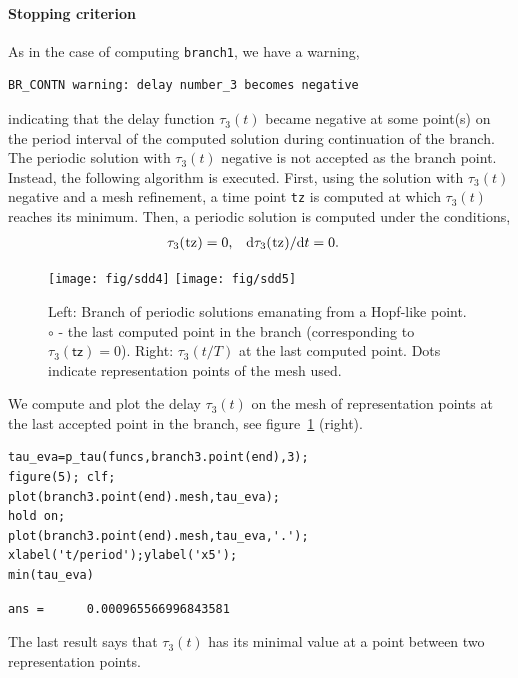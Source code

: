 \documentclass[10pt]{scrartcl}
\newcommand{\parm}[1]{\mathsf{#1}}
\renewcommand{\d}{\mathrm{d}}
\newcommand{\blist}[1]{\mbox{\lstinline!#1!}}
\begin{document}
\paragraph{Stopping criterion}
As in the case of computing \blist{branch1}, we have a warning,
{\small
\begin{verbatim}
BR_CONTN warning: delay number_3 becomes negative
\end{verbatim}}
\noindent
indicating that the delay function $\tau_3(t)$ became negative at some
point(s) on the period interval of the computed solution during
continuation of the branch.  The periodic solution with $\tau_3(t)$
negative is not accepted as the branch point.  Instead, the following
algorithm is executed. First, using the solution with $\tau_3(t)$
negative and a mesh refinement, a time point \blist{tz} is computed
at which $\tau_3(t)$ reaches its minimum.  Then, a periodic solution
is computed under the conditions,
\begin{align}\label{tz_cond}
\tau_3(\blist{tz})&=0\mbox{,}&{\d}\tau_3(\blist{tz})/{\d}t&=0\mbox{.}
\end{align}

\begin{figure}[h]
  \begin{center}
    \texttt{[image: fig/sdd4]}
    \texttt{[image: fig/sdd5]}
  \end{center}
  \caption{\label{br_ps_sd1}Left: Branch of periodic solutions emanating
    from a Hopf-like point. $\circ$ - the last computed point in the branch
    (corresponding to $\tau_3(\parm{tz})=0$). Right: $\tau_3(t/T)$ at 
    the last computed point. Dots indicate representation points
    of the mesh used.}
\end{figure}
We compute and plot the delay $\tau_3(t)$ on the mesh of representation points
at the last accepted point in the
branch, see figure~\ref{br_ps_sd1} (right).
\begin{lstlisting}
tau_eva=p_tau(funcs,branch3.point(end),3);
figure(5); clf;
plot(branch3.point(end).mesh,tau_eva);
hold on;
plot(branch3.point(end).mesh,tau_eva,'.');
xlabel('t/period');ylabel('x5');
min(tau_eva)  
\end{lstlisting}
{\small
\begin{verbatim} 
ans =      0.000965566996843581
\end{verbatim}}
\noindent
The last result says that $\tau_3(t)$  has its minimal value 
at a point between two representation points.
\end{document}
